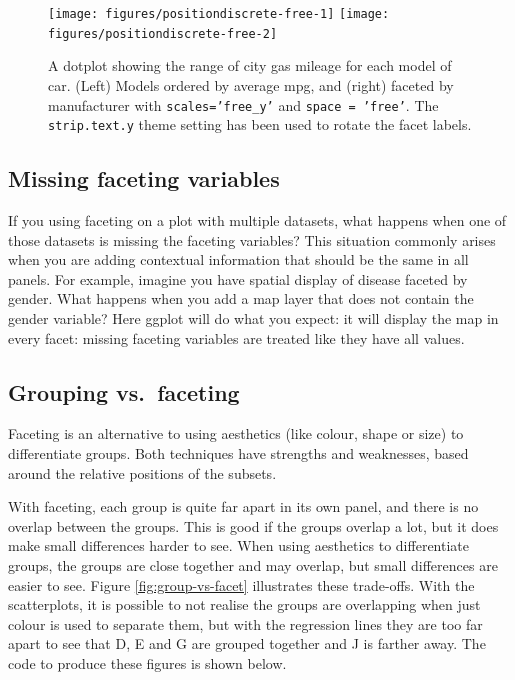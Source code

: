 \begin{figure}

{\centering \texttt{[image: figures/positiondiscrete-free-1]} \texttt{[image: figures/positiondiscrete-free-2]} 

}

\caption{A dotplot showing the range of city gas mileage for each model of car. (Left) Models ordered by average mpg, and (right) faceted by manufacturer with \texttt{scales='free\_y'} and \texttt{space = 'free'}. The \texttt{strip.text.y} theme setting has been used to rotate the facet labels.\label{fig:discrete-free}}
\end{figure}

\subsection{Missing faceting
variables}\label{sub:missing-faceting-columns}

If you using faceting on a plot with multiple datasets, what happens
when one of those datasets is missing the faceting variables? This
situation commonly arises when you are adding contextual information
that should be the same in all panels. For example, imagine you have
spatial display of disease faceted by gender. What happens when you add
a map layer that does not contain the gender variable? Here ggplot will
do what you expect: it will display the map in every facet: missing
faceting variables are treated like they have all values.

\subsection{Grouping vs.~faceting}\label{sub:group-vs-facet}

Faceting is an alternative to using aesthetics (like colour, shape or
size) to differentiate groups. Both techniques have strengths and
weaknesses, based around the relative positions of the subsets.
 

With faceting, each group is quite far apart in its own panel, and there
is no overlap between the groups. This is good if the groups overlap a
lot, but it does make small differences harder to see. When using
aesthetics to differentiate groups, the groups are close together and
may overlap, but small differences are easier to see. Figure
\ref{fig:group-vs-facet} illustrates these trade-offs. With the
scatterplots, it is possible to not realise the groups are overlapping
when just colour is used to separate them, but with the regression lines
they are too far apart to see that D, E and G are grouped together and J
is farther away. The code to produce these figures is shown below.


